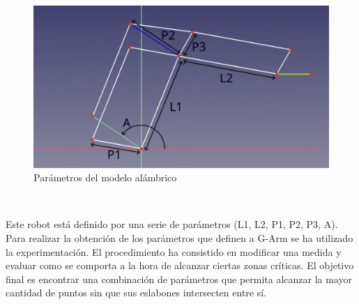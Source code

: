 \begin{figure} [ht!]
  \begin{center}
    \includegraphics[width=15cm]{figs/mearm_params.png}
  \end{center}
  \caption{Parámetros del modelo alámbrico}
  \label{fig:mod_pinza_figure}
\end{figure}\ 

Este robot está definido por una serie de parámetros (L1, L2, P1, P2, P3, A). Para realizar la obtención de los parámetros que definen a 
G-Arm se ha utilizado la experimentación. El procedimiento ha consistido en modificar una medida y evaluar como se 
comporta a la hora de alcanzar ciertas zonas críticas. El objetivo final es encontrar una combinación de parámetros que 
permita alcanzar la mayor cantidad de puntos sin que sus eslabones intersecten entre sí. 

